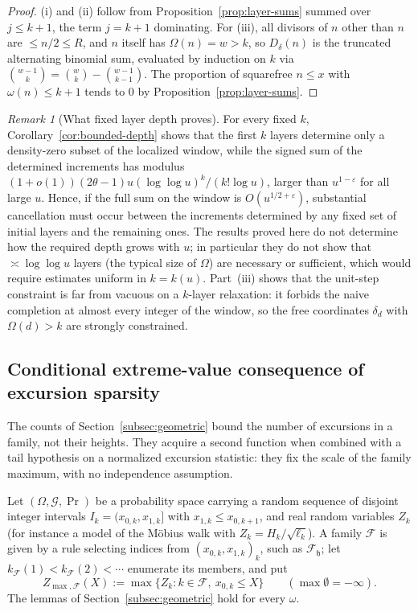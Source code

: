 \documentclass[11pt]{amsart}
\numberwithin{equation}{section}
\theoremstyle{plain}
\theoremstyle{definition}
\theoremstyle{remark}
\newtheorem{remark}[theorem]{Remark}
\newcommand{\eps}{\varepsilon}
\newcommand{\F}{\mathcal{F}}
\begin{document}
\begin{proof}
(i) and (ii) follow from Proposition~\ref{prop:layer-sums} summed over
$j\le k+1$, the term $j=k+1$ dominating. For (iii), all divisors of $n$
other than $n$ are $\le n/2\le R$, and $n$ itself has $\Omega(n)=w>k$, so
$D_\delta(n)$ is the truncated alternating binomial sum, evaluated by
induction on $k$ via $\binom{w-1}{k}=\binom wk-\binom{w-1}{k-1}$. The
proportion of squarefree $n\le x$ with $\omega(n)\le k+1$ tends to $0$ by
Proposition~\ref{prop:layer-sums}.
\end{proof}

\begin{remark}[What fixed layer depth proves]
\label{rem:depth-content}
For every fixed $k$, Corollary~\ref{cor:bounded-depth} shows that the first
$k$ layers determine only a density-zero subset of the localized window,
while the signed sum of the determined increments has modulus
$(1+o(1))(2\theta-1)u(\log\log u)^k/(k!\log u)$, larger than $u^{1-\eps}$
for all large $u$. Hence, if the full sum on the window is
$O(u^{1/2+\eps})$, substantial cancellation must occur between the
increments determined by any fixed set of initial layers and the remaining
ones. The results proved here do not determine how the required depth grows
with $u$; in particular they do not show that $\asymp\log\log u$ layers
(the typical size of $\Omega$) are necessary or sufficient, which would
require estimates uniform in $k=k(u)$. Part~(iii) shows that the unit-step
constraint is far from vacuous on a $k$-layer relaxation: it forbids the
naive completion at almost every integer of the window, so the free
coordinates $\delta_d$ with $\Omega(d)>k$ are strongly constrained.
\end{remark}


\subsection{Conditional extreme-value consequence of excursion sparsity}
\label{subsec:extreme}

The counts of Section~\ref{subsec:geometric} bound the number of excursions
in a family, not their heights. They acquire a second function when combined
with a tail hypothesis on a normalized excursion statistic: they fix the
scale of the family maximum, with no independence assumption.

Let $(\Omega,\mathcal G,\Pr)$ be a probability space carrying a random
sequence of disjoint integer intervals $I_k=(x_{0,k},x_{1,k}]$ with
$x_{1,k}\le x_{0,k+1}$, and real random variables $Z_k$ (for instance a model
of the M\"obius walk with $Z_k=H_k/\sqrt{\ell_k}$). A family $\F$ is given by
a rule selecting indices from $(x_{0,k},x_{1,k})_k$, such as $\F_{\mathfrak h}$; let
$k_\F(1)<k_\F(2)<\cdots$ enumerate its members, and put
\[
Z_{\max,\F}(X):=\max\{Z_k:k\in\F,\ x_{0,k}\le X\}\qquad(\max\emptyset=-\infty).
\]
The lemmas of Section~\ref{subsec:geometric} hold for every $\omega$.
\end{document}
